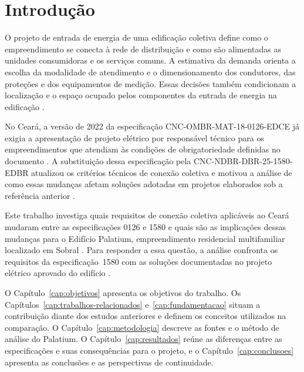\chapter{Introdução}
\label{cap:introducao}

O projeto de entrada de energia de uma edificação coletiva define como o empreendimento se conecta à rede de distribuição e como são alimentadas as unidades consumidoras e os serviços comuns. A estimativa da demanda orienta a escolha da modalidade de atendimento e o dimensionamento dos condutores, das proteções e dos equipamentos de medição. Essas decisões também condicionam a localização e o espaço ocupado pelos componentes da entrada de energia na edificação \cite[seções~7.11 e~7.18]{enel1580}.

No Ceará, a versão de 2022 da especificação CNC-OMBR-MAT-18-0126-EDCE já exigia a apresentação de projeto elétrico por responsável técnico para os empreendimentos que atendiam às condições de obrigatoriedade definidas no documento \cite[seção~7.12]{enel0126}. A substituição dessa especificação pela CNC-NDBR-DBR-25-1580-EDBR atualizou os critérios técnicos de conexão coletiva e motivou a análise de como essas mudanças afetam soluções adotadas em projetos elaborados sob a referência anterior \cite[seções~1 e~2]{enel1580}.

Este trabalho investiga quais requisitos de conexão coletiva aplicáveis ao Ceará mudaram entre as especificações 0126 e 1580 e quais são as implicações dessas mudanças para o Edifício Palatium, empreendimento residencial multifamiliar localizado em Sobral \cite[p.~1 e~5]{palatiummemorial2025}. Para responder a essa questão, a análise confronta os requisitos da especificação~1580 com as soluções documentadas no projeto elétrico aprovado do edifício \cite{enelaprovacao2025}.

O Capítulo~\ref{cap:objetivos} apresenta os objetivos do trabalho. Os Capítulos~\ref{cap:trabalhos-relacionados} e~\ref{cap:fundamentacao} situam a contribuição diante dos estudos anteriores e definem os conceitos utilizados na comparação. O Capítulo~\ref{cap:metodologia} descreve as fontes e o método de análise do Palatium. O Capítulo~\ref{cap:resultados} reúne as diferenças entre as especificações e suas consequências para o projeto, e o Capítulo~\ref{cap:conclusoes} apresenta as conclusões e as perspectivas de continuidade.

